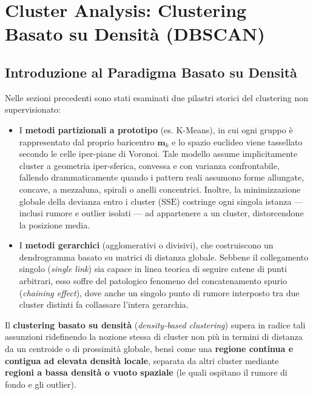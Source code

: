 \chapter{Cluster Analysis: Clustering Basato su Densità (DBSCAN)}
\label{chap:dm-density-dbscan}

\FloatBarrier
\section{Introduzione al Paradigma Basato su Densità}
\label{sec:dm-dbscan-intro}

Nelle sezioni precedenti sono stati esaminati due pilastri storici del clustering non supervisionato:
\begin{itemize}
    \item I \textbf{metodi partizionali a prototipo} (es. K-Means), in cui ogni gruppo è rappresentato dal proprio baricentro $\mathbf{m}_k$ e lo spazio euclideo viene tassellato secondo le celle iper-piane di Voronoi. Tale modello assume implicitamente cluster a geometria iper-sferica, convessa e con varianza confrontabile, fallendo drammaticamente quando i pattern reali assumono forme allungate, concave, a mezzaluna, spirali o anelli concentrici. Inoltre, la minimizzazione globale della devianza entro i cluster ($\mathrm{SSE}$) costringe ogni singola istanza --- inclusi rumore e outlier isolati --- ad appartenere a un cluster, distorcendone la posizione media.
    \item I \textbf{metodi gerarchici} (agglomerativi o divisivi), che costruiscono un dendrogramma basato su matrici di distanza globale. Sebbene il collegamento singolo (\textit{single link}) sia capace in linea teorica di seguire catene di punti arbitrari, esso soffre del patologico fenomeno del concatenamento spurio (\textit{chaining effect}), dove anche un singolo punto di rumore interposto tra due cluster distinti fa collassare l'intera gerarchia.
\end{itemize}

Il \textbf{clustering basato su densità} (\textit{density-based clustering}) supera in radice tali assunzioni ridefinendo la nozione stessa di cluster non più in termini di distanza da un centroide o di prossimità globale, bensì come una \textbf{regione continua e contigua ad elevata densità locale}, separata da altri cluster mediante \textbf{regioni a bassa densità o vuoto spaziale} (le quali ospitano il rumore di fondo e gli outlier).

